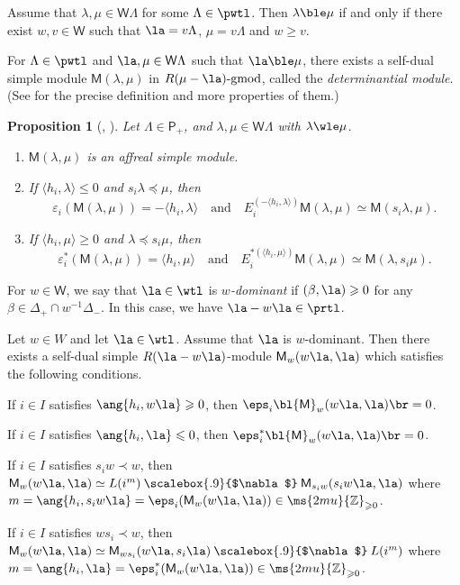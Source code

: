 \documentclass[12pt,leqno]{amsart}%
\renewcommand{\le}{\leqslant}
\renewcommand{\ge}{\geqslant}
\theoremstyle{plain}
\newtheorem{prop}[thm]{Proposition}
\theoremstyle{definition}
\newcommand{\Z}{\ms{2mu}{\mathbb Z}}
\newcommand{\gmod}{\text{-}\mathrm{gmod}}
\newcommand{\hconv}{\mathbin{\scalebox{.9}{$\nabla$}}}
\newcommand{\wlP}{\mathsf{P}}   %
\newcommand{\weyl}{\mathsf{W}}  %
\newcommand{\prD}{\Delta_+}            %
\newcommand{\nrD}{\Delta_-}            %
\newcommand{\dM}{ \mathsf{M }}              %
\newcommand{\ep}{\varepsilon}  		%
\newcommand{\La}{\Lambda} 			%
\newcommand{\Mm}{{\mathsf{M}}}
\newcommand{\bna}{\be[{\rm(a)}]}
\numberwithin{equation}{section}
\begin{document}
Assume that $\lambda, \mu \in \weyl \Lambda$ for some $\La \in \pwtl$.
Then $\lambda \ble \mu$ if and only if there exist $w,v\in\weyl$ such that
$\la=v\La$, $\mu=v\La$ and $w\ge v$.

For $\La\in\pwtl$ and $\la,\mu\in\weyl\La$ such that $\la\ble \mu$,
there exists a self-dual simple module  $\dM(\lambda, \mu)$ in $R(\mu-\la)\gmod$,  called  the \emph{determinantial module}.  (See \cite[Section 3.3]{KKOP21} for the precise definition and more properties of them.)

\begin{prop}
[{\cite[Lemma 1.7, Proposition 4.2]{KKOP18}, \cite[Lemma 3.23, Theorem 3.26]{KKOP21}}] \label{Prop: dM properties}
Let $\Lambda \in \wlP_+$, and $\lambda, \mu \in \weyl \Lambda$ with $\lambda \wle \mu$.
\begin{enumerate} [\rm (i)]
\item  $\dM(\lambda, \mu)$ is an affreal simple module.
\item If $ \langle h_i, \lambda \rangle \le 0$ and $s_i \lambda \preceq \mu $, then
$$
\ep_i( \dM(\lambda, \mu)) = - \langle h_i, \lambda \rangle \quad \text{and} \quad  E_i^{(- \langle h_i, \lambda \rangle)} \dM(\lambda, \mu) \simeq \dM(s_i\lambda, \mu).
$$
\item If $ \langle h_i, \mu \rangle \ge 0$ and $ \lambda \preceq s_i \mu $, then
$$
\ep^*_i( \dM(\lambda, \mu)) =  \langle h_i, \mu \rangle \quad \text{and} \quad  E_i^{* (\langle h_i, \mu \rangle)} \dM(\lambda, \mu) \simeq \dM(\lambda, s_i\mu).
$$
\end{enumerate}
\end{prop}

For $w\in\weyl$, we say that
$\la \in \wtl$ is {\em $w$-dominant} if 
$(\beta,\la)\ge0$ for any $\beta\in\prD\cap w^{-1}\nrD$.
In this case, we have $\la-w\la\in\prtl$. 

 \label{thm:gdm}
Let $w\in W$ and let $\la\in\wtl$.
Assume that $\la$ is $w$-dominant.
Then there exists a self-dual simple $R(\la-w\la)$-module
$\Mm_w(w\la,\la)$ which satisfies the following conditions.
\bna
\item
If $i\in I$ satisfies $\ang{h_i,w\la}\ge0$,
then $\eps_i\bl\Mm_w(w\la,\la)\br=0$.\label{item eps}

\item
If $i\in I$ satisfies $\ang{h_i,\la}\le0$,
then $\eps^*_i\bl\Mm_w(w\la,\la)\br=0$.\label{item epsstar}
\item 
If $i\in I$ satisfies $s_iw  \prec w$, then
$\Mm_w(w\la,\la)\simeq L(i^m)\hconv \Mm_{s_iw}(s_iw\la,\la)$
where $m=\ang{h_i,s_iw\la} = \eps_i(\Mm_w(w\la,\la)) \in\Z_{\ge0}$.\label{item a}
\item
If $i\in I$ satisfies $ws_i\prec w$, then
$\Mm_w(w\la,\la)\simeq \Mm_{ws_i}(w\la,s_i\la)\hconv L(i^m) $
where $m=\ang{h_i,\la} = \eps^*_i(\Mm_w(w\la,\la))\in\Z_{\ge0}  $.\label{item: sla} \
\end{document}
